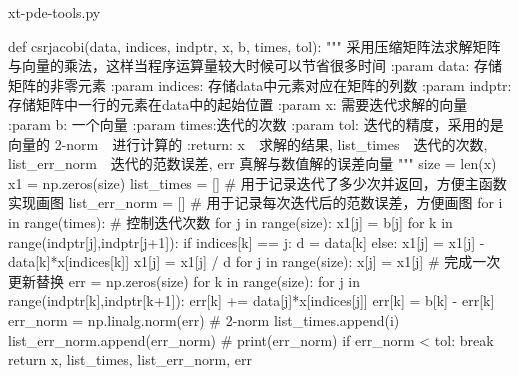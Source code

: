 \documentclass[UTF8]{ctexart}
\begin{document}
xt-pde-tools.py

\begin{python}
def csrjacobi(data, indices, indptr,  x, b, times, tol):
    """
    采用压缩矩阵法求解矩阵与向量的乘法，这样当程序运算量较大时候可以节省很多时间
    :param data: 存储矩阵的非零元素
    :param indices: 存储data中元素对应在矩阵的列数
    :param indptr: 存储矩阵中一行的元素在data中的起始位置
    :param x: 需要迭代求解的向量
    :param b: 一个向量
    :param times:迭代的次数
    :param tol: 迭代的精度，采用的是向量的 2-norm　进行计算的
    :return: x　求解的结果, list_times　迭代的次数,
    list_err_norm　迭代的范数误差, err 真解与数值解的误差向量
    """
    size = len(x)
    x1 = np.zeros(size)
    list_times = []  # 用于记录迭代了多少次并返回，方便主函数实现画图
    list_err_norm = []  # 用于记录每次迭代后的范数误差，方便画图
    for i in range(times):  # 控制迭代次数
        for j in range(size):
            x1[j] = b[j]
            for k in range(indptr[j],indptr[j+1]):
                if indices[k] == j:
                    d = data[k]
                else:
                    x1[j] = x1[j] - data[k]*x[indices[k]]
            x1[j] = x1[j] / d
        for j in range(size):
            x[j] = x1[j]  # 完成一次更新替换
        err = np.zeros(size)
        for k in range(size):
            for j in range(indptr[k],indptr[k+1]):
                err[k] += data[j]*x[indices[j]]
            err[k] = b[k] - err[k]
        err_norm = np.linalg.norm(err)  # 2-norm
        list_times.append(i)
        list_err_norm.append(err_norm)
        # print(err_norm)
        if err_norm < tol:
            break
    return x, list_times, list_err_norm, err
\end{python}
\end{document}
